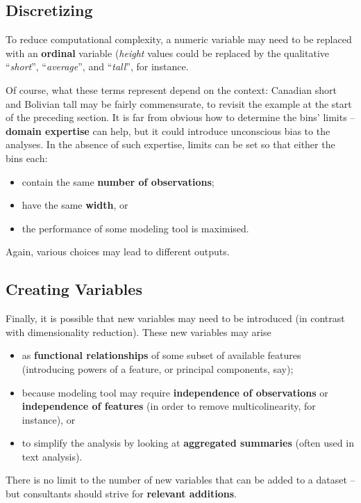 \subsection{Discretizing} To reduce computational complexity, a numeric variable may need to be replaced with an \textbf{ordinal} variable (\textit{height} values could be replaced by the qualitative ``\textit{short}'', ``\textit{average}'', and ``\textit{tall}'', for instance. \par Of course, what these terms represent depend on the context: Canadian short and Bolivian tall may be fairly commensurate, to revisit the example at the start of the preceding section.  \newpage\noindent It is far from obvious how to  determine the bins' limits  -- \textbf{domain expertise} can help, but it could introduce unconscious bias to the analyses. In the absence of such expertise, limits can be set so that either the bins each: 
\begin{itemize}[noitemsep]
\item contain the same \textbf{number of observations};
\item have the same \textbf{width}, or 
\item the performance of some modeling tool is maximised. 
\end{itemize}
Again, various choices may lead to different outputs. 
\subsection{Creating Variables} Finally, it is possible that new variables may need to be introduced (in contrast with dimensionality reduction). These new variables may arise
\begin{itemize}[noitemsep]
\item as \textbf{functional relationships} of some subset of available features (introducing powers of a feature, or principal components, say);
\item because modeling tool may require \textbf{independence of observations} or \textbf{independence of features} (in order to remove multicolinearity, for instance), or 
\item to simplify the analysis by looking at \textbf{aggregated summaries} (often used in text analysis).
\end{itemize}
There is no limit to the number of new variables that can be added to a dataset -- but consultants should strive for \textbf{relevant additions}.